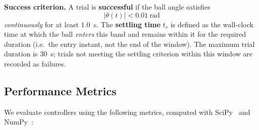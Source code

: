\textbf{Success criterion.}
A trial is \textbf{successful} if the ball angle satisfies
\begin{equation}
  |\theta(t)| < 0.01~\text{rad}
\end{equation}
\emph{continuously} for at least $1.0$~s.
The \textbf{settling time} $t_s$ is defined as the wall-clock time at
which the ball \emph{enters} this band and remains within it for the
required duration (i.e.\ the entry instant, not the end of the window).
The maximum trial duration is $30$~s; trials not meeting the settling
criterion within this window are recorded as failures.

\subsection{Performance Metrics}

We evaluate controllers using the following metrics, computed with
SciPy~\cite{2020SciPy-NMeth} and NumPy~\cite{harris2020array}:


